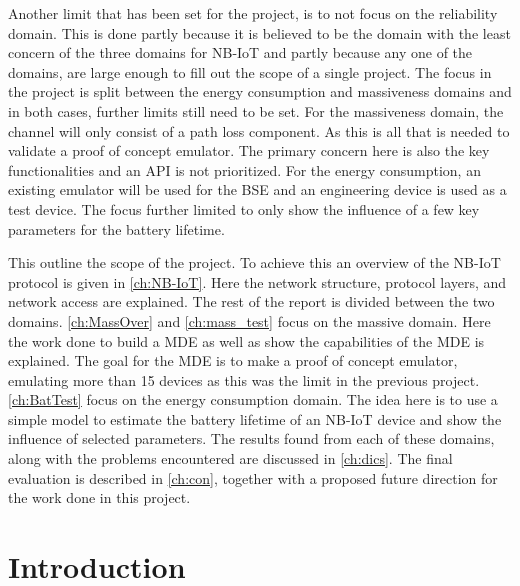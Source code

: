 Another limit that has been set for the project, is to not focus on the reliability domain. This is done partly because it is believed to be the domain with the least concern of the three domains for NB-IoT and partly because any one of the domains, are large enough to fill out the scope of a single project. The focus in the project is split between the energy consumption and massiveness domains and in both cases, further limits still need to be set. For the massiveness domain, the channel will only consist of a path loss component. As this is all that is needed to validate a proof of concept emulator. The primary concern here is also the key functionalities and an API is not prioritized. For the energy consumption, an existing emulator will be used for the BSE and an engineering device is used as a test device. The focus further limited to only show the influence of a few key parameters for the battery lifetime. %

This outline the scope of the project. To achieve this an overview of the \gls{NB-IoT} protocol is given in \autoref{ch:NB-IoT}. Here the network structure, protocol layers, and network access are explained. The rest of the report is divided between the two domains. \autoref{ch:MassOver} and \autoref{ch:mass_test} focus on the massive domain. Here the work done to build a \gls{MDE} as well as show the capabilities of the \gls{MDE} is explained. The goal for the MDE is to make a proof of concept emulator, emulating more than 15 devices as this was the limit in the previous project. \autoref{ch:BatTest} focus on the energy consumption domain. The idea here is to use a simple model to estimate the battery lifetime of an NB-IoT device and show the influence of selected parameters. The results found from each of these domains, along with the problems encountered are discussed in \autoref{ch:dics}. The final evaluation is described in \autoref{ch:con}, together with a proposed future direction for the work done in this project. 





\chapter{Introduction}\label{ch:Introduction}




